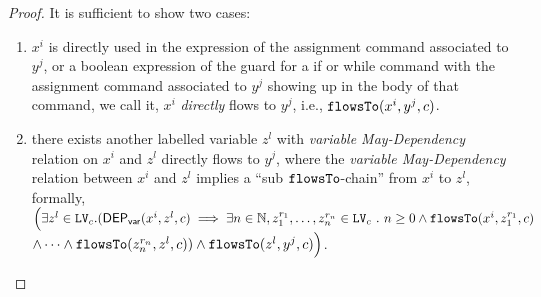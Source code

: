 {\begin{proof}
    It is sufficient to show two cases:
    \begin{enumerate}
      \item  $x^i$ is directly used in the expression of the assignment command associated to $y^j$, or a boolean
      expression of the guard for a if or while command with the assignment command associated to $y^j$ showing up in the body of that command, 
      we call it, $x^i$ \emph{directly} flows to $y^j$,
      i.e.,  $ \mathtt{flowsTo}(x^i, y^j, {c})$.
      \item there exists another labelled variable $z^l$ with \emph{variable May-Dependency} relation on $x^i$ and 
      $z^l$ directly flows to $y^j$, where the \emph{variable May-Dependency} relation between $x^i$ and $z^l$ implies a ``sub $\mathtt{flowsTo}$-chain'' from $x^i$ to $z^l$, 
      formally, 
      $\Big(
        \exists z^l \in \mathtt{LV}_{{c}}.
      (\mathsf{DEP_{var}}(x^i, z^l, {c})   
      \implies
        \exists n \in \mathbb{N}, z_1^{r_1}, \ldots, z_n^{r_n} \in \mathtt{LV}_{{c}} ~.~ n \geq 0 \land
      \mathtt{flowsTo}(x^i,  z_1^{r_1}, c)$ 
      $\land \cdots \land \mathtt{flowsTo}(z_n^{r_n}, z^l, c)
      )
      \land  \mathtt{flowsTo}(z^l, y^j, {c})
      \Big)$.
    \end{enumerate}

\end{proof}}
